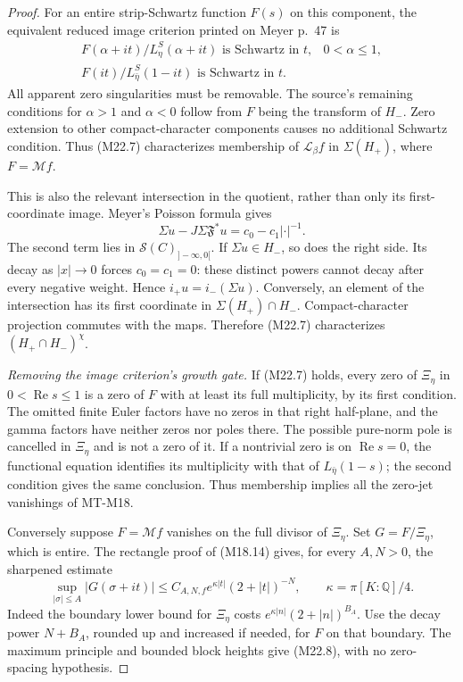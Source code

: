 \documentclass[11pt,a4paper]{article}
\begin{document}
\begin{proof}
For an entire strip-Schwartz function \(F(s)\)
on this component, the equivalent reduced
image criterion printed on Meyer p.~47 is
\[
 \begin{array}{ll}
 F(\alpha+it)/L_\eta^S(\alpha+it)
        \text{ is Schwartz in }t,&0<\alpha\le1,\\[2mm]
 F(it)/L_{\bar\eta}^S(1-it)
        \text{ is Schwartz in }t.&
 \end{array}                                                    \tag{M22.7}
\]
All apparent zero singularities must be removable.
The source's remaining conditions for
\(\alpha>1\) and \(\alpha<0\) follow from \(F\)
being the transform of \(H_-\).
Zero extension to other compact-character
components causes no additional Schwartz condition.
Thus (M22.7) characterizes membership of
\(\mathcal L_\beta f\) in \(\Sigma(H_+)\),
where \(F=\mathcal Mf\).

This is also the relevant intersection in
the quotient, rather than only its first-coordinate
image.  Meyer's Poisson formula gives
\[
 \Sigma u-J\Sigma\mathfrak F^*u
                         =c_0-c_1|\cdot|^{-1}.
\]
The second term lies in
\(\mathcal S(C)_{]-\infty,0[}\).
If \(\Sigma u\in H_-\), so does the right side.
Its decay as \(|x|\to0\) forces \(c_0=c_1=0\):
these distinct powers cannot decay after every
negative weight.  Hence
\(i_+u=i_-(\Sigma u)\).
Conversely, an element of the intersection has
its first coordinate in \(\Sigma(H_+)\cap H_-\).
Compact-character projection commutes with the
maps.  Therefore (M22.7) characterizes
\((H_+\cap H_-)^\chi\).

\emph{Removing the image criterion's growth gate.}
If (M22.7) holds, every zero of \(\Xi_\eta\) in
\(0<\operatorname{Re}s\le1\) is a zero of \(F\)
with at least its full multiplicity, by its first
condition.  The omitted finite Euler factors have
no zeros in that right half-plane, and the gamma
factors have neither zeros nor poles there.
The possible pure-norm pole is cancelled in
\(\Xi_\eta\) and is not a zero of it.
If a nontrivial zero is on \(\operatorname{Re}s=0\),
the functional equation identifies its multiplicity
with that of \(L_{\bar\eta}(1-s)\); the second
condition gives the same conclusion.
Thus membership implies all the zero-jet
vanishings of MT-M18.

Conversely suppose \(F=\mathcal Mf\) vanishes
on the full divisor of \(\Xi_\eta\).
Set \(G=F/\Xi_\eta\), which is entire.
The rectangle proof of (M18.14) gives,
for every \(A,N>0\), the sharpened estimate
\[
 \sup_{|\sigma|\le A}|G(\sigma+it)|
       \le C_{A,N,f}e^{\kappa|t|}(2+|t|)^{-N},
 \qquad \kappa=\pi[K:\mathbb Q]/4.                              \tag{M22.8}
\]
Indeed the boundary lower bound for \(\Xi_\eta\)
costs \(e^{\kappa|n|}(2+|n|)^{B_A}\).
Use the decay power \(N+B_A\), rounded up and
increased if needed, for \(F\) on that boundary.
The maximum principle and bounded block heights
give (M22.8), with no zero-spacing hypothesis.


\end{proof}
\end{document}
